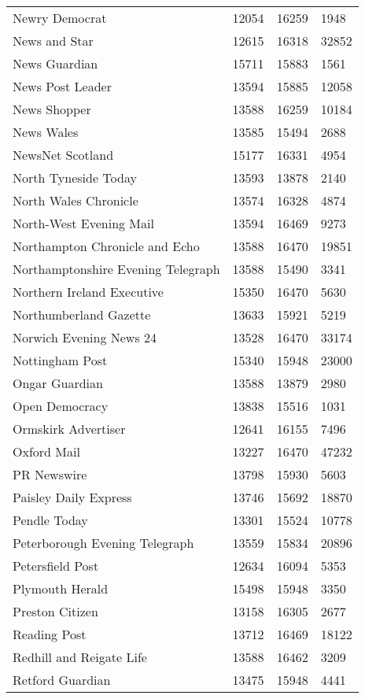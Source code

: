 \begin{longtable}{p{}p{}p{}p{}}
  Newry Democrat & 12054 & 16259 & 1948 \\ 
  News and Star & 12615 & 16318 & 32852 \\ 
  News Guardian & 15711 & 15883 & 1561 \\ 
  News Post Leader & 13594 & 15885 & 12058 \\ 
  News Shopper & 13588 & 16259 & 10184 \\ 
  News Wales & 13585 & 15494 & 2688 \\ 
  NewsNet Scotland & 15177 & 16331 & 4954 \\ 
  North Tyneside Today & 13593 & 13878 & 2140 \\ 
  North Wales Chronicle & 13574 & 16328 & 4874 \\ 
  North-West Evening Mail & 13594 & 16469 & 9273 \\ 
  Northampton Chronicle and Echo & 13588 & 16470 & 19851 \\ 
  Northamptonshire Evening Telegraph & 13588 & 15490 & 3341 \\ 
  Northern Ireland Executive & 15350 & 16470 & 5630 \\ 
  Northumberland Gazette & 13633 & 15921 & 5219 \\ 
  Norwich Evening News 24 & 13528 & 16470 & 33174 \\ 
  Nottingham Post & 15340 & 15948 & 23000 \\ 
  Ongar Guardian & 13588 & 13879 & 2980 \\ 
  Open Democracy & 13838 & 15516 & 1031 \\ 
  Ormskirk Advertiser & 12641 & 16155 & 7496 \\ 
  Oxford Mail & 13227 & 16470 & 47232 \\ 
  PR Newswire & 13798 & 15930 & 5603 \\ 
  Paisley Daily Express & 13746 & 15692 & 18870 \\ 
  Pendle Today & 13301 & 15524 & 10778 \\ 
  Peterborough Evening Telegraph & 13559 & 15834 & 20896 \\ 
  Petersfield Post & 12634 & 16094 & 5353 \\ 
  Plymouth Herald & 15498 & 15948 & 3350 \\ 
  Preston Citizen & 13158 & 16305 & 2677 \\ 
  Reading Post & 13712 & 16469 & 18122 \\ 
  Redhill and Reigate Life & 13588 & 16462 & 3209 \\ 
  Retford Guardian & 13475 & 15948 & 4441 \\ 

\end{longtable}
